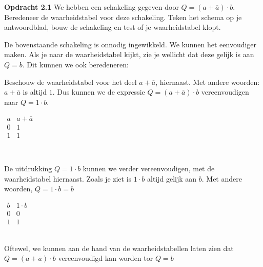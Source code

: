 \documentclass[11pt,a5paper]{report}
\begin{document}
\begin{framed}
\textbf{Opdracht 2.1} We hebben een schakeling gegeven door $Q = (a + \overline{a}) \cdot b$.\\
Beredeneer de waarheidstabel voor deze schakeling. Teken het schema op je antwoordblad, bouw de schakeling en test of je waarheidstabel klopt.
\end{framed}

De bovenstaande schakeling is onnodig ingewikkeld. We kunnen het eenvoudiger maken. Als je naar de waarheidstabel kijkt, zie je wellicht dat deze gelijk is aan $Q = b$. Dit kunnen we ook beredeneren:


\begin{minipage}[t]{0.750\textwidth}
Beschouw de waarheidstabel voor het deel $a + \overline{a}$, hiernaast. Met andere woorden: $a + \overline{a}$ is altijd  $1$. Dus kunnen we de expressie $Q = (a+ \overline{a}) \cdot b$ vereenvoudigen naar $Q = 1 \cdot b$.

\end{minipage}%
\hfill
\begin{minipage}[t]{0.13\textwidth}
\vspace*{-1em}
\(
\begin{array}{c|c}
a & a + \overline{a} \\
\hline
0 & 1 \\
1 & 1
\end{array}
\)
\end{minipage}\\




\begin{minipage}[t]{0.750\textwidth}
De uitdrukking $Q = 1 \cdot b$ kunnen we verder vereenvoudigen, met de waarheidstabel hiernaast. Zoals je ziet is $1 \cdot b$ altijd gelijk aan $b$. Met andere woorden, $Q =  1 \cdot b = b$

\end{minipage}%
\hfill
\begin{minipage}[t]{0.13\textwidth}
\vspace*{-1em}
\(
\begin{array}{c|c}
b & 1 \cdot b \\
\hline
0 & 0 \\
1 & 1
\end{array}
\)
\end{minipage}\\

Oftewel, we kunnen aan de hand van de waarheidstabellen laten zien dat $Q = (a + \overline{a}) \cdot b$ vereenvoudigd kan worden tor $Q = b$
\end{document}
